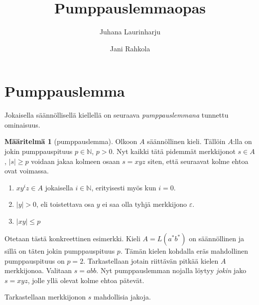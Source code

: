 \documentclass[a4paper,11pt]{article}
\title{Pumppauslemmaopas}
\author{Juhana Laurinharju \and Jani Rahkola}
\theoremstyle{definition}
\newtheorem*{definition}{Määritelmä}
\newcommand{\Nat}{\mathbb{N}}
\begin{document}
\maketitle

\section*{Pumppauslemma}

Jokaisella säännöllisellä kiellellä on seuraava \emph{pumppauslemmana} tunnettu
ominaisuus.

\begin{definition}[pumppauslemma]
    Olkoon $A$ säännöllinen kieli. Tällöin $A$:lla on jokin pumppauspituus $p
    \in \Nat$, $p > 0$. Nyt kaikki tätä pidemmät merkkijonot $s \in A$, $|s|
    \geq p$ voidaan jakaa kolmeen osaan $s = xyz$ siten, että seuraavat kolme
    ehtoa ovat voimassa.

    \begin{enumerate}
        \item
          $xy^iz \in A$ jokaisella $i \in \Nat$, erityisesti myös kun
          $i = 0$.
        \item
          $|y| > 0$, eli toistettava osa $y$ ei saa olla tyhjä
          merkkijono $\varepsilon$.
        \item
          $|xy| \leq p$
    \end{enumerate}
\end{definition}

Otetaan tästä konkreettinen esimerkki. Kieli $A = L(a^*b^*)$ on säännöllinen ja
sillä on täten jokin pumppauspituus $p$. Tämän kielen kohdalla eräs mahdollinen
pumppauspituus on $p = 2$. Tarkastellaan jotain riittävän pitkää kielen $A$
merkkijonoa. Valitaan $s = abb$. Nyt pumppauslemman nojalla löytyy \emph{jokin}
jako $s = xyz$, jolle yllä olevat kolme ehtoa pätevät.

Tarkastellaan merkkijonon $s$ mahdollisia jakoja.
\end{document}
